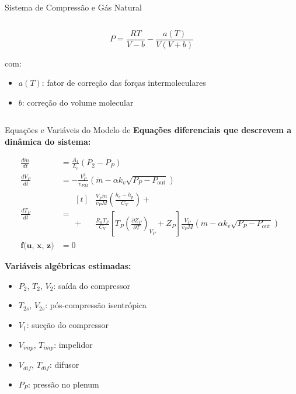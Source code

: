 \begin{frame}{Sistema de Compressão e Gás Natural}
\begin{columns}[T]
\begin{column}{0.52\textwidth}
            \[
            P = \frac{R T}{V - b} - \frac{a(T)}{V(V + b)}
            \]

            com:
            \begin{itemize}
                \item \( a(T) \): fator de correção das forças intermoleculares
                \item \( b \): correção do volume molecular
            \end{itemize}
        \end{column}
    \end{columns}
\end{frame}



\begin{frame}{Equações e Variáveis do Modelo de \cite{Meira2022} }
    \scriptsize
    \textbf{Equações diferenciais que descrevem a dinâmica do sistema:}

    \begin{multicols}{2}
    \begin{align}
        \frac{d\dot{m}}{dt} &= \frac{A_1}{L_c}(P_2 - P_P) \tag{1} \\
        \frac{dV_P}{dt} &= -\frac{V_P^2}{v_{PM}} \left( \dot{m} - \alpha k_v \sqrt{P_P - P_{\text{out}}} \right) \tag{2} \\
        \frac{dT_P}{dt} &= 
        \begin{aligned}[t]
            &\frac{V_P \dot{m}}{v_P M} \left( \frac{h_c - h_p}{C_V} \right) + \\
            + &\frac{R_a T_P}{C_V} \left[ T_P \left( \frac{\partial Z_P}{\partial T} \right)_{V_P} + Z_P \right]
            \frac{V_P}{v_P M} \left( \dot{m} - \alpha k_v \sqrt{P_P - P_{\text{out}}} \right)
        \end{aligned} \tag{3} \\
        \textbf{f(u, x, z)} &= 0 \tag{4}
    \end{align}

    \columnbreak
    \begin{minipage}{\linewidth}
        \textbf{Variáveis algébricas estimadas:}
        \begin{itemize}
            \item \( P_2 \), \( T_2 \), \( V_2 \): saída do compressor
            \item \( T_{2s} \), \( V_{2s} \): pós-compressão isentrópica
            \item \( V_1 \): sucção do compressor
            \item \( V_{imp} \), \( T_{imp} \): impelidor
            \item \( V_{dif} \), \( T_{dif} \): difusor
            \item \( P_P \): pressão no plenum
        \end{itemize}
    \end{minipage}
    \end{multicols}
\end{frame}